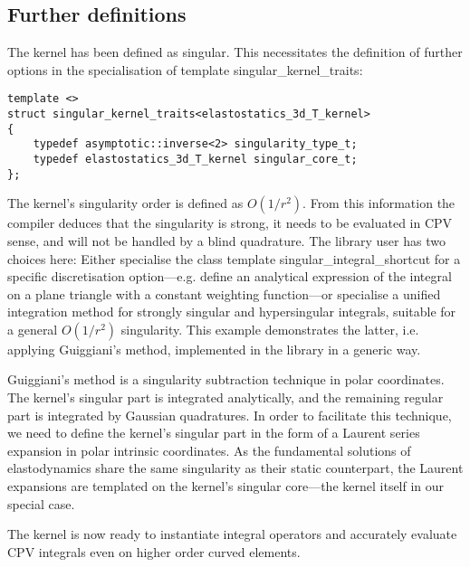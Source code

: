 \documentclass{article}
\begin{document}
\subsection{Further definitions}

The kernel has been defined as singular.
This necessitates the definition of further options in the specialisation of template singular\_kernel\_traits:
%
\begin{lstlisting}
template <>
struct singular_kernel_traits<elastostatics_3d_T_kernel>
{
	typedef asymptotic::inverse<2> singularity_type_t;
	typedef elastostatics_3d_T_kernel singular_core_t;
};
\end{lstlisting}
%
The kernel's singularity order is defined as $O(1/r^2)$.
From this information the compiler deduces that the singularity is strong, it needs to be evaluated in CPV sense, and will not be handled by a blind quadrature.
The library user has two choices here: Either specialise the class template singular\_integral\_shortcut for a specific discretisation option---e.g. define an analytical expression of the integral on a plane triangle with a constant weighting function---or specialise a unified integration method for strongly singular and hypersingular integrals, suitable for a general $O(1/r^2)$ singularity.
This example demonstrates the latter, i.e. applying Guiggiani's method, implemented in the library in a generic way.

Guiggiani's method is a singularity subtraction technique in polar coordinates.
The kernel's singular part is integrated analytically, and the remaining regular part is integrated by Gaussian quadratures.
In order to facilitate this technique, we need to define the kernel's singular part in the form of a Laurent series expansion in polar intrinsic coordinates.
As the fundamental solutions of elastodynamics share the same singularity as their static counterpart, the Laurent expansions are templated on the kernel's singular core---the kernel itself in our special case.


%
The kernel is now ready to instantiate integral operators and accurately evaluate CPV integrals even on higher order curved elements.
\end{document}
